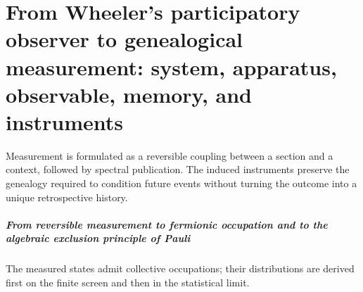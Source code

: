 \chapter{From Wheeler's participatory observer to genealogical measurement: system,
apparatus, observable, memory, and instruments}
\label{chap:parte-iv-54}

Measurement is formulated as a reversible coupling between a section and a context, followed by spectral publication. The induced instruments preserve the genealogy required to condition future events without turning the outcome into a unique retrospective history.





\paragraph{From reversible measurement to fermionic occupation and to the algebraic exclusion principle of Pauli} The measured states admit collective occupations; their distributions are derived first on the finite screen and then in the statistical limit.
